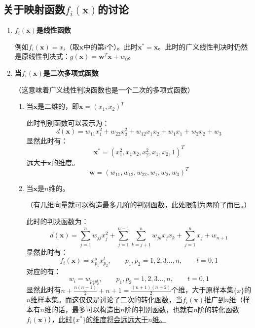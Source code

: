 \documentclass[12pt, letterpaper]{article}
\begin{document}
\subsection{关于映射函数\texorpdfstring{$f_i(\mathbf{\mathbf{\mathbf{x}}})$}{}的讨论}
\begin{enumerate}
\item \textbf{$f_i(\mathbf{x})$是线性函数}

\qquad 例如$f_i(\mathbf{x})=x_i$（取$\mathbf{x}$中的第$i$个）。此时$\mathbf{x^*}=\mathbf{x}$。此时的广义线性判决时仍然是原线性判决式：$g(\mathbf{x})=\mathbf{w}^T\mathbf{x}+w_0$。

\item \textbf{当$f_i(\mathbf{x})$是二次多项式函数}

\qquad（这意味着广义线性判决函数也是一个二次的多项式函数）

\begin{enumerate}
\item 当$\mathbf{x}$是二维的，即$\mathbf{x}=(x_1, x_2)^T$

\qquad 此时判别函数可以表示为：
\begin{equation}
d(\mathbf{x})=w_{11}x_1^2+w_{22}x_2^2+w_{12}x_1x_2+w_1x_1+w_2x_2+w_3
\end{equation}
显然此时有：
$$\mathbf{x^*}=(x_1^2,x_1x_2, x_2^2,x_1,x_2,1)^T$$
远大于$\mathbf{x}$的维度。
$$\mathbf{w}=(w_{11},w_{12},w_{22},w_1,w_2,w_3)^T$$
\item 当$\mathbf{x}$是$n$维的。

（有几维向量就可以构造最多几阶的判别函数，此处限制为两阶了而已。）

\qquad 此时的判决函数为：
\begin{equation}
d(\mathbf{x})=\sum_{j=1}^nw_{jj}x_j^2+\sum_{j=1}^{n-1}\sum_{k=j+1}^{n}w_{jk}x_jx_k+\sum_{j=1}^nx_j+w_{n+1}
\end{equation}
显然此时有：
\begin{equation}
f_i(\mathbf{x})=x_{p_{1}}^sx_{p_2}^t,\qquad p_1,p_2=1,2,3\ldots,n,\qquad t=0,1
\end{equation}
对应的有：
\begin{equation}
w_i=w_{p_1^sp_2^t},\qquad p_1,p_2=1,2,3\ldots,n,\qquad t=0,1
\end{equation}
显然此时有$n + \frac{n(n-1)}{2} + n + 1 = \frac{(n+1)(n+2)}{2} $个维，大于原样本集$\{x\}$的$n$维样本集。而这仅仅是讨论了二次的转化函数，当$f_i(\mathbf{x})$推广到$n$维（样本有$n$维的话，最多可以构造出$n$阶的判别函数，也就有$n$阶的转化函数$f_i(\mathbf{x})$），\underline{此时$\{x^*\}$的维度将会远远大于$n$维。}


\end{enumerate}
\end{enumerate}
\end{document}
